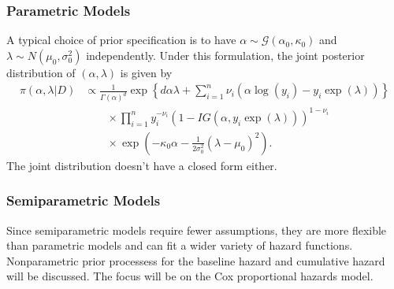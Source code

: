 \documentclass{beamer}
\begin{document}
	\begin{frame}
		\frametitle{Parametric Models}
		A typical choice of prior specification is to have $\alpha \sim \mathcal{G}(\alpha_0, \kappa_0)$ and $\lambda \sim N(\mu_0, \sigma_0 ^ 2)$ independently. Under this formulation, the joint posterior  distribution of $(\alpha, \lambda)$ is given by
		\begin{equation*}
			\begin{split}
				\pi(\alpha, \lambda | D) & \propto\frac{1}{\Gamma(\alpha) ^ d}\exp\left\{d\alpha\lambda + \sum_{i = 1}^{n}\nu_i(\alpha\log(y_i) - y_i\exp(\lambda))\right\} \\
				& \quad\quad\times\prod_{i = 1}^{n}y_i ^ {-\nu_i}(1 - IG(\alpha, y_i\exp(\lambda))) ^ {1 - \nu_i} \\
				& \quad\quad\times\exp\left(-\kappa_0\alpha - \frac{1}{2\sigma_0 ^ 2}(\lambda - \mu_0) ^ 2\right).
			\end{split}
		\end{equation*}
		The joint distribution doesn't have a closed form either.
	\end{frame}
	
	\begin{frame}
		\frametitle{Semiparametric Models}
		Since semiparametric models require fewer assumptions, they are more flexible than parametric models and can fit a wider variety of hazard functions. Nonparametric prior processess for the baseline hazard and cumulative hazard will be discussed. The focus will be on the Cox proportional hazards model. 
	\end{frame}
	
\end{document}
